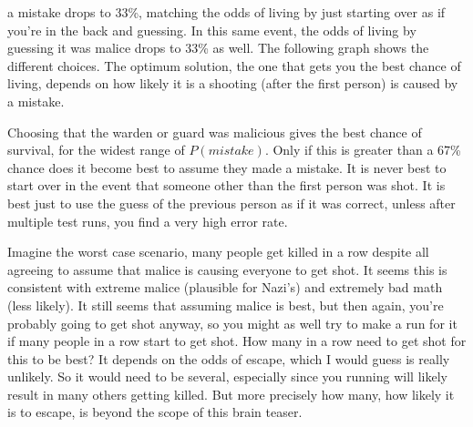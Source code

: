 \documentclass[10pt]{article}
\begin{document}
a mistake drops to 33\%, matching the odds of living by just starting over 
as if you're in the back and guessing. In this same event, the odds of 
living by guessing it was malice drops to 33\% as well. The following 
graph shows the different choices. The optimum solution, the one that 
gets you the best chance of living, depends on how likely it is 
a shooting (after the first person) is caused by a mistake.
\begin{figure}[H]
\centering
{}
\end{figure}
Choosing that the warden or guard was malicious gives the best chance of 
survival, for the widest range of $P(mistake)$. Only if this is greater 
than a 67\% chance does it become best to assume they made a mistake. It 
is never best to start over in the event that someone other than the first 
person was shot. It is best just to use the guess of the previous person 
as if it was correct, unless after multiple test runs, you find a very 
high error rate. 

Imagine the worst case scenario, many people get killed in a row despite 
all agreeing to assume that malice is causing everyone to get shot. 
It seems this is consistent with extreme malice (plausible for Nazi's) and 
extremely bad math (less likely). It still seems that 
assuming malice is best, but 
then again, you're probably going to get shot anyway, so you might as well 
try to make a run for it if many people in a row start to get shot. 
How many in a row need to get shot for this to be best? It depends on the 
odds of escape, which I would guess is really unlikely. So it would need to be 
several, especially since you running will likely result in many others 
getting killed. But more precisely how many, how likely it is to escape, 
is beyond the scope of this brain teaser.
\end{document}
